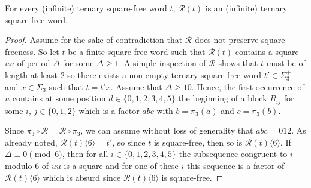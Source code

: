 \documentclass[10pt,a4paper]{amsart}
\newcommand{\subsequence}[2]{#1\langle#2\rangle}
\begin{document}
\begin{proposition}\label{prop:6-compl-sqfree}
    For every (infinite) ternary square-free word $t$, $\mathcal{R}(t)$ is an (infinite) ternary square-free word.
\end{proposition}

\begin{proof}
    Assume for the sake of contradiction that $\mathcal{R}$ does not preserve square-freeness. So let $t$ be a finite square-free word such that $\mathcal{R}(t)$ contains a square $uu$ of period $\Delta$ for some $\Delta \geq 1$. A simple inspection of $\mathcal{R}$ shows that $t$ must be of length at least $2$ so there exists a non-empty ternary square-free word $t' \in \Sigma_3^+$ and $x \in \Sigma_3$ such that $t = t'x$.
    Assume that $\Delta \ge 10$. Hence, the first occurrence of $u$ contains at some position $d\in\{0,1,2,3,4,5\}$ the beginning of a block $R_{ij}$ for some $i$, $j \in \{0, 1, 2\}$ which is a factor $abc$ with $b = \pi_3(a)$ and $c = \pi_3(b)$.

    Since $\pi_3\circ\mathcal{R} = \mathcal{R}\circ\pi_3$, we can assume without loss of generality that $abc = 012$. As already noted, $\subsequence{\mathcal{R}(t)}{6} = t'$, so since $t$ is square-free, then so is $\subsequence{\mathcal{R}(t)}{6}$. If $\Delta \equiv 0 \pmod6$, then for all $i \in \{0, 1, 2, 3, 4, 5\}$ the subsequence congruent to $i$ modulo $6$ of $uu$ is a square and for one of these $i$ this sequence is a factor of $\subsequence{\mathcal{R}(t)}{6}$ which is absurd since $\subsequence{\mathcal{R}(t)}{6}$ is square-free.
    

\end{proof}
\end{document}
